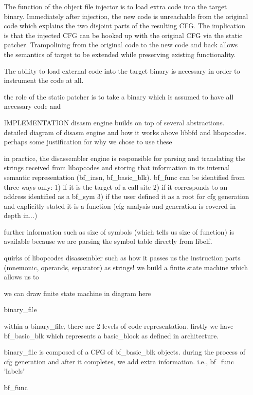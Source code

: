 The function of the object file injector is to load extra code into the target binary. Immediately after injection, the new code is unreachable from the original code which explains the two disjoint parts of the resulting CFG. The implication is that the injected CFG can be hooked up with the original CFG via the static patcher. Trampolining from the original code to the new code and back allows the semantics of target to be extended while preserving existing functionality.

The ability to load external code into the target binary is necessary in order to instrument the code at all. 

the role of the static patcher is to take a binary which is assumed to have all necessary code and 

IMPLEMENTATION
disasm engine builds on top of several abstractions. detailed diagram of disasm engine and how it works above libbfd and libopcodes. perhaps some justification for why we chose to use these

in practice, the disassembler engine is responsible for parsing and translating the strings received from libopcodes and storing that information in its internal semantic representation (bf\_insn, bf\_basic\_blk). bf\_func can be identified from three ways only:
1) if it is the target of a call site
2) if it corresponds to an address identified as a bf\_sym
3) if the user defined it as a root for cfg generation and explicitly stated it is a function (cfg analysis and generation is covered in depth in...)

further information such as size of symbols (which tells us size of function) is available because we are parsing the symbol table directly from libelf.

quirks of libopcodes disassembler such as how it passes us the instruction parts (mnemonic, operands, separator) as strings! we build a finite state machine which allows us to 

we can draw finite state machine in diagram here

binary\_file

within a binary\_file, there are 2 levels of code representation. firstly we have bf\_basic\_blk which represents a basic\_block as defined in architecture.

binary\_file is composed of a CFG of bf\_basic\_blk objects. during the process of cfg generation and after it completes, we add extra information. i.e., bf\_func 'labels'

bf\_func

